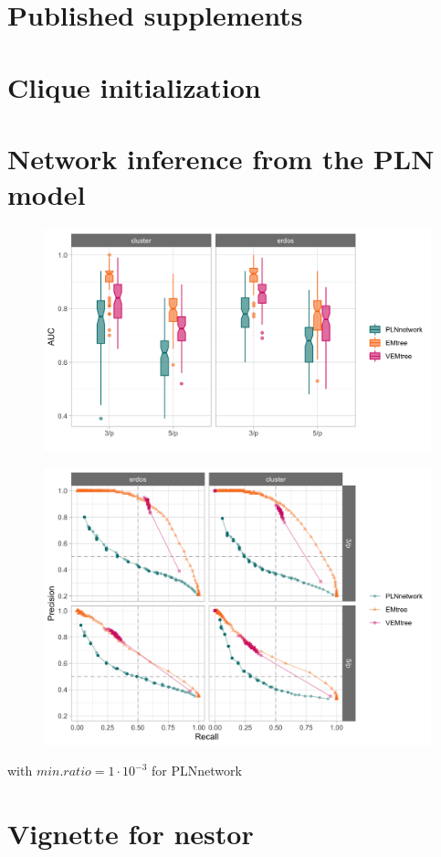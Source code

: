 
 
 












\begin{subappendices}
\section{Published supplements}



\section{Clique initialization}
\section{Network inference from the PLN model}

\begin{figure}
\centering
\includegraphics[width=12cm]{figs/AUC_PLN_EM_VEM.png}
\end{figure}
\begin{figure}
\centering
\includegraphics[width=12cm]{figs/precrec_PLN_EM_VEM.png}
\end{figure}

with $min.ratio=1\cdot 10^{-3}$ for PLNnetwork
\section{Vignette for nestor}
\end{subappendices}